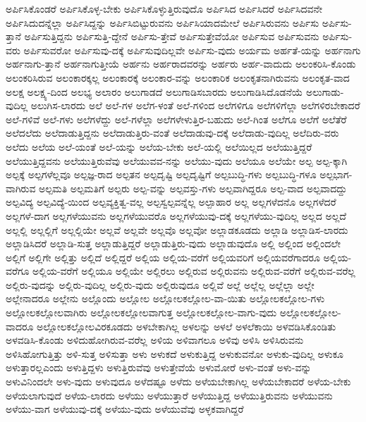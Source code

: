 {ಅರ್ಪಿಸಿಕೊಂಡರೆ
ಅರ್ಪಿಸಿಕೊಳ್ಳ-ಬೇಕು
ಅರ್ಪಿಸಿಕೊಳ್ಳುತ್ತಿರುವುದೊ
ಅರ್ಪಿಸಿದ
ಅರ್ಪಿಸಿದರೆ
ಅರ್ಪಿಸಿದವನೇ
ಅರ್ಪಿಸಿದುದನ್ನೆಲ್ಲಾ
ಅರ್ಪಿಸಿದ್ದನ್ನು
ಅರ್ಪಿಸಿಬಿಟ್ಟುರುವನು
ಅರ್ಪಿಸಿಯಾದಮೇಲೆ
ಅರ್ಪಿಸಿರುವನು
ಅರ್ಪಿಸು
ಅರ್ಪಿಸು-ತ್ತಾನೆ
ಅರ್ಪಿಸುತ್ತಿದ್ದನು
ಅರ್ಪಿಸುತ್ತಿ-ದ್ದೇನೆ
ಅರ್ಪಿಸು-ತ್ತೇವೆ
ಅರ್ಪಿಸುತ್ತೇವೆಯೋ
ಅರ್ಪಿಸುವ
ಅರ್ಪಿಸುವನು
ಅರ್ಪಿಸು-ವರು
ಅರ್ಪಿಸುವರೋ
ಅರ್ಪಿಸುವು-ದಕ್ಕೆ
ಅರ್ಪಿಸುವುದಿಲ್ಲವೇ
ಅರ್ಪಿಸು-ವುದು
ಅರ್ಯಮ
ಅರ್ಹತೆ-ಯನ್ನು
ಅರ್ಹನಾಗು
ಅರ್ಹನಾಗು-ತ್ತಾನೆ
ಅರ್ಹನಾಗುತ್ತೀಯೆ
ಅರ್ಹನು
ಅರ್ಹರಾದವರನ್ನು
ಅರ್ಹರು
ಅರ್ಹ-ವಾದುದು
ಅಲಂಕರಿಸಿ-ಕೊಂಡು
ಅಲಂಕರಿಸಿರುವ
ಅಲಂಕಾರಕ್ಕಲ್ಲ
ಅಲಂಕಾರಕ್ಕೆ
ಅಲಂಕಾರ-ವನ್ನು
ಅಲಂಕಾರಿಕ
ಅಲಂಕೃತನಾಗಿರುವನು
ಅಲಂಕೃತ-ವಾದ
ಅಲಕ್ಷ
ಅಲಕ್ಷ್ಯ-ದಿಂದ
ಅಲಭ್ಯ
ಅಲಾರಂ
ಅಲುಗಾಡದೆ
ಅಲುಗಾಡಿಸಬಾರದು
ಅಲುಗಾಡಿಸಿದೊಡನೆಯೆ
ಅಲುಗಾಡು-ವುದಿಲ್ಲ
ಅಲುಗಿಸ-ಲಾರದು
ಅಲೆ
ಅಲೆ-ಗಳ
ಅಲೆಗ-ಳಂತೆ
ಅಲೆ-ಗಳಿಂದ
ಅಲೆಗಳಿಗೂ
ಅಲೆಗಳಿಗೆಲ್ಲಾ
ಅಲೆಗಳಿರಬೇಕಾದರೆ
ಅಲೆ-ಗಳಿವೆ
ಅಲೆ-ಗಳು
ಅಲೆಗಳೆದ್ದು
ಅಲೆ-ಗಳೆಲ್ಲಾ
ಅಲೆಗಳೇಳುತ್ತಿರ-ಬಹುದು
ಅಲೆ-ಗಿಂತ
ಅಲೆಗೂ
ಅಲೆಗೆ
ಅಲೆತೆರೆ
ಅಲೆದಲೆದು
ಅಲೆದಾಡುತ್ತಿದ್ದನು
ಅಲೆದಾಡುತ್ತಿರು-ವಂತೆ
ಅಲೆದಾಡುವು-ದಕ್ಕೆ
ಅಲೆದಾಡು-ವುದಿಲ್ಲ
ಅಲೆದಿರು-ವರು
ಅಲೆದು
ಅಲೆಯ
ಅಲೆ-ಯಂತೆ
ಅಲೆ-ಯನ್ನು
ಅಲೆಯ-ಬೇಕು
ಅಲೆ-ಯಲ್ಲಿ
ಅಲೆಯಿಲ್ಲದ
ಅಲೆಯುತ್ತಿದ್ದರೆ
ಅಲೆಯುತ್ತಿದ್ದವನು
ಅಲೆಯುತ್ತಿರುವೆವು
ಅಲೆಯುವವ-ನನ್ನು
ಅಲೆಯು-ವುದು
ಅಲೆಯೂ
ಅಲೆಯೇ
ಅಲ್ಪ
ಅಲ್ಪ-ಕ್ಕಾಗಿ
ಅಲ್ಪಕ್ಕೆ
ಅಲ್ಪಗಳೆಲ್ಲವೂ
ಅಲ್ಪಜ್ಞ-ರಾದ
ಅಲ್ಪತನ
ಅಲ್ಪದೃಷ್ಟಿ
ಅಲ್ಪದೃಷ್ಟಿಗೆ
ಅಲ್ಪಬುದ್ಧಿ-ಗಳು
ಅಲ್ಪಬುದ್ಧಿ-ಗಳೂ
ಅಲ್ಪಭಾಗ-ವಾಗಿರುವ
ಅಲ್ಪಮತಿ
ಅಲ್ಪಮತಿಗೆ
ಅಲ್ಪರು
ಅಲ್ಪ-ವನ್ನು
ಅಲ್ಪವಸ್ತು-ಗಳು
ಅಲ್ಪವಾಗಿದ್ದರೂ
ಅಲ್ಪ-ವಾದ
ಅಲ್ಪವಾದದ್ದು
ಅಲ್ಪವಿದ್ಯ
ಅಲ್ಪವಿದ್ಯೆ-ಯಿಂದ
ಅಲ್ಪವ್ಯಕ್ತಿತ್ವ-ವಲ್ಲ
ಅಲ್ಪಸ್ವಲ್ಪವನ್ನೆಲ್ಲ
ಅಲ್ಪಾಹಾರ
ಅಲ್ಲ
ಅಲ್ಲಗಳೆದನೊ
ಅಲ್ಲಗಳೆದರೆ
ಅಲ್ಲಗಳೆ-ದಾಗ
ಅಲ್ಲಗಳೆಯುವನು
ಅಲ್ಲಗಳೆಯುವರೊ
ಅಲ್ಲಗಳೆಯುವು-ದಕ್ಕೆ
ಅಲ್ಲಗಳೆಯು-ವುದಿಲ್ಲ
ಅಲ್ಲದ
ಅಲ್ಲದೆ
ಅಲ್ಲಲ್ಲಿ
ಅಲ್ಲಲ್ಲಿಗೆ
ಅಲ್ಲಲ್ಲಿಯೇ
ಅಲ್ಲವೆ
ಅಲ್ಲವೇ
ಅಲ್ಲವೊ
ಅಲ್ಲವೋ
ಅಲ್ಲಾಡಕೂಡದು
ಅಲ್ಲಾಡಿ
ಅಲ್ಲಾಡಿಸ-ಲಾರದು
ಅಲ್ಲಾಡಿಸಿದರೆ
ಅಲ್ಲಾಡಿ-ಸುತ್ತ
ಅಲ್ಲಾಡುತ್ತಿದ್ದರೆ
ಅಲ್ಲಾಡುತ್ತಿರು-ವುದು
ಅಲ್ಲಾಡುವುದೊ
ಅಲ್ಲಿ
ಅಲ್ಲಿಂದ
ಅಲ್ಲಿಂದಲೇ
ಅಲ್ಲಿಗೆ
ಅಲ್ಲಿಗೇ
ಅಲ್ಲಿತ್ತು
ಅಲ್ಲಿದೆ
ಅಲ್ಲಿದ್ದರೆ
ಅಲ್ಲಿಯ
ಅಲ್ಲಿಯ-ವರೆಗೆ
ಅಲ್ಲಿಯವರಿಗೆ
ಅಲ್ಲಿಯವರೆಗಾದರೂ
ಅಲ್ಲಿಯ-ವರೆಗೂ
ಅಲ್ಲಿಯ-ವರೆಗೆ
ಅಲ್ಲಿಯೂ
ಅಲ್ಲಿಯೇ
ಅಲ್ಲಿರಲು
ಅಲ್ಲಿರುವ
ಅಲ್ಲಿರುವನು
ಅಲ್ಲಿರುವ-ವರೆಗೆ
ಅಲ್ಲಿರುವ-ವರೆಲ್ಲ
ಅಲ್ಲಿರು-ವುದನ್ನು
ಅಲ್ಲಿರು-ವುದಿಲ್ಲ
ಅಲ್ಲಿರು-ವುದು
ಅಲ್ಲಿರುವುದೂ
ಅಲ್ಲಿವೆ
ಅಲ್ಲೆ
ಅಲ್ಲೆಲ್ಲ
ಅಲ್ಲೆಲ್ಲಾ
ಅಲ್ಲೇ
ಅಲ್ಲೇನಾದರೂ
ಅಲ್ಲೇನು
ಅಲ್ಲೊಂದು
ಅಲ್ಲೋಲ
ಅಲ್ಲೋಲಕಲ್ಲೋಲ-ವಾ-ಯಿತು
ಅಲ್ಲೋಲಕಲ್ಲೋಲ-ಗಳು
ಅಲ್ಲೋಲಕಲ್ಲೋಲವಾಗಿರು
ಅಲ್ಲೋಲಕಲ್ಲೋಲವಾಗುತ್ತ
ಅಲ್ಲೋಲಕಲ್ಲೋಲ-ವಾಗು-ವುದು
ಅಲ್ಲೋಲಕಲ್ಲೋಲ-ವಾದರೂ
ಅಲ್ಲೋಲಕಲ್ಲೋಲವಿರಕೂಡದು
ಅಳಬೇಕಾಗಿಲ್ಲ
ಅಳಲನ್ನು
ಅಳಲೆ
ಅಳಲೆಕಾಯಿ
ಅಳವಡಿಸಿಕೊಂಡಿತು
ಅಳವಡಿಸಿ-ಕೊಂಡು
ಅಳಿದುಹೋಗಿರುವ-ವರೆಲ್ಲ
ಅಳಿಯ
ಅಳಿವಾಗಲೂ
ಅಳಿವು
ಅಳಿಸಿ
ಅಳಿಸಿರುವನು
ಅಳಿಸಿಹೋಗುತ್ತಿತ್ತು
ಅಳಿ-ಸುತ್ತ
ಅಳಿಸುತ್ತಾ
ಅಳು
ಅಳುಕದೆ
ಅಳುಕುತ್ತಿದ್ದ
ಅಳುಕುವನೋ
ಅಳುಕು-ವುದಿಲ್ಲ
ಅಳುಕೂ
ಅಳುತ್ತಾರಲ್ಲಎಂದು
ಅಳುತ್ತಿದ್ದಳು
ಅಳುತ್ತಿರುವೆವು
ಅಳುತ್ತೇವೆಯೆ
ಅಳುಮೋರೆ
ಅಳು-ವಂತೆ
ಅಳು-ವನ್ನು
ಅಳುವಿನಿಂದಲೇ
ಅಳು-ವುದು
ಅಳುವುದೂ
ಅಳೆದಷ್ಟೂ
ಅಳೆದು
ಅಳೆಯಬೇಕಾಗಿಲ್ಲ
ಅಳೆಯಬೇಕಾದರೆ
ಅಳೆಯ-ಬೇಕು
ಅಳೆಯಲಾಗುವುದೆ
ಅಳೆಯ-ಲಾರದು
ಅಳೆಯು
ಅಳೆಯುತ್ತಾರೆ
ಅಳೆಯುತ್ತಿದ್ದ
ಅಳೆಯುತ್ತಿರುವನು
ಅಳೆಯುವನು
ಅಳೆಯು-ವಾಗ
ಅಳೆಯುವು-ದಕ್ಕೆ
ಅಳೆಯು-ವುದು
ಅಳೆಯುವೆವು
ಅಳ್ಳಕವಾಗಿದ್ದರೆ
}
